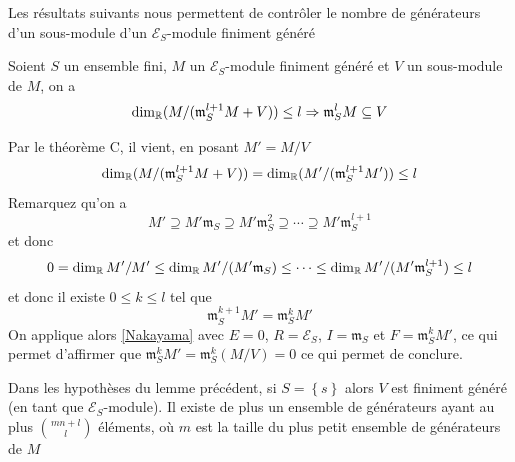 \documentclass[memoire.tex]{subfiles}
\begin{document}
Les résultats suivants nous permettent de contrôler le nombre de 
générateurs d'un sous-module d'un $\mathcal{E}_S$-module 
finiment généré
\begin{lemme}\label{Lemme inclusion}
    Soient $S$ un ensemble fini, $M$ un 
    $\mathcal{E}_S$-module finiment généré et $V$ un 
    sous-module de $M$, on a 
    \begin{equation*}
        \dim_{\mathbb{R}}( M/(\mathfrak{m}_S^{l+1}M+V))\leq 
        l\Rightarrow \mathfrak{m}_S^{l}M\subseteq V
    \end{equation*}
\end{lemme}
\begin{preuve}
    Par le théorème C, il vient, en posant $M'=M/V$
    \begin{equation*}
        \dim_{\mathbb{R}}( M/(\mathfrak{m}_S^{l+1}M+V))=\dim_{\mathbb{R}}
        ( M'/(\mathfrak{m}_S^{l+1}M'))\leq l
    \end{equation*}
    Remarquez qu'on a 
    \begin{equation*}
        M'\supseteq M'\mathfrak{m}_S\supseteq M'\mathfrak{m}^2_S\supseteq \cdots \supseteq M'\mathfrak{m}^{l+1}_S
    \end{equation*}
    et donc 
    \begin{equation*}
        0=\dim_{\mathbb{R}} M'/M'\leq \dim_{\mathbb{R}} M'/( M'\mathfrak{m}_S)\leq\cdots \leq  \dim_{\mathbb{R}} M'/(M'\mathfrak{m}_S^{l+1})\leq l
    \end{equation*}
    et donc il existe $0\leq k \leq l$ tel que 
    \begin{equation*}
        \mathfrak{m}_S^{k+1}M'=\mathfrak{m}_S^{k}M'
    \end{equation*}
    On applique alors \ref{Nakayama} avec $E=0$, $R=\mathcal{E}_S$, $I=\mathfrak{m}_S$ et $F=\mathfrak{m}_S^kM'$, ce qui permet d'affirmer que $\mathfrak{m}_S^k M'=\mathfrak{m}_S^k (M/V)=0$ ce qui permet de conclure.
\end{preuve}



\begin{proposition}
    Dans les hypothèses du lemme précédent, si $S=\left\{s\right\}$ alors $V$ est finiment généré (en tant que $\mathcal{E}_S$-module).
    Il existe de plus un ensemble de générateurs ayant au plus $m 
    {n+l}\choose {l}$ éléments, où $m$ est la taille du plus petit ensemble de générateurs de $M$
\end{proposition}
\end{document}

